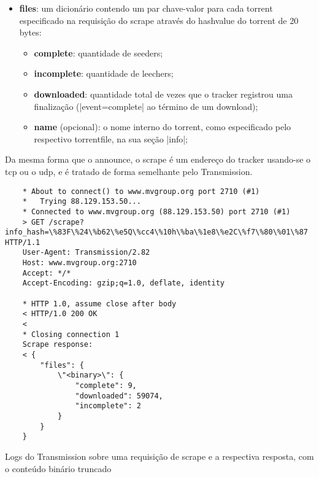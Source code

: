 \begin{itemize}
    \item \textbf{files}: um dicionário contendo um par chave-valor para cada
    \gls*{torrent} especificado na requisição do \gls*{scrape} através do
    \gls*{hashvalue} do \gls*{torrent} de 20 bytes:

    \begin{itemize}
        \item \textbf{complete}: quantidade de \glspl*{seeder};

        \item \textbf{incomplete}: quantidade de \glspl*{leecher};

        \item \textbf{downloaded}: quantidade total de vezes que o \gls*{tracker}
        registrou uma finalização (\sverb|event=complete| ao término de um download);

        \item \textbf{name} (opcional): o nome interno do \gls*{torrent}, como
        especificado pelo respectivo \gls*{torrentfile}, na sua seção \bverb|info|;
    \end{itemize}
\end{itemize}

Da mesma forma que o \gls*{announce}, o \gls*{scrape} é um endereço do \gls*{tracker}
usando-se o \gls*{tcp} ou o \gls*{udp}, e é tratado de forma semelhante pelo
Transmission.


\begin{listing}[H]
    \begin{verbatim}
    * About to connect() to www.mvgroup.org port 2710 (#1)
    *   Trying 88.129.153.50...
    * Connected to www.mvgroup.org (88.129.153.50) port 2710 (#1)
    > GET /scrape?info_hash=\%83F\%24\%b62\%e5Q\%cc4\%10h\%ba\%1e8\%e2C\%f7\%80\%01\%87 HTTP/1.1
    User-Agent: Transmission/2.82
    Host: www.mvgroup.org:2710
    Accept: */*
    Accept-Encoding: gzip;q=1.0, deflate, identity

    * HTTP 1.0, assume close after body
    < HTTP/1.0 200 OK
    <
    * Closing connection 1
    Scrape response:
    < {
        "files": {
            \"<binary>\": {
                "complete": 9,
                "downloaded": 59074,
                "incomplete": 2
            }
        }
    }
    \end{verbatim}

    \caption{Logs do Transmission sobre uma requisição de scrape e a respectiva
    resposta, com o conteúdo binário truncado}
    \label{lst:scrape}
\end{listing}

